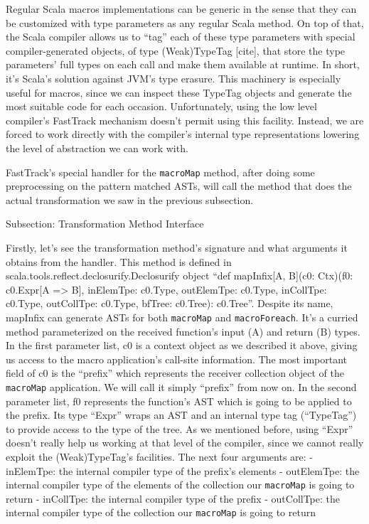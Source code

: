 Regular Scala macros implementations can be generic in the sense that they can
be customized with type parameters as any regular Scala method. On top of that,
the Scala compiler allows us to ``tag'' each of these type parameters with
special compiler-generated objects, of type (Weak)TypeTag [cite], that store the
type parameters' full types on each call and make them available at runtime. In
short, it's Scala's solution against JVM's type erasure. This machinery is
especially useful for macros, since we can inspect these TypeTag objects and
generate the most suitable code for each occasion. Unfortunately, using the low
level compiler's FastTrack mechanism doesn't permit using this facility.
Instead, we are forced to work directly with the compiler's internal type
representations lowering the level of abstraction we can work with.

FastTrack's special handler for the \texttt{macroMap} method, after
doing some preprocessing on the pattern matched ASTs, will call the method
that does the actual transformation we saw in the previous subsection. 


Subsection: Transformation Method Interface

Firstly, let's see the transformation method's signature and what arguments it
obtains from the handler. This method is defined in
scala.tools.reflect.declosurify.Declosurify object ``def mapInfix[A, B](c0:
Ctx)(f0: c0.Expr[A => B], inElemTpe: c0.Type, outElemTpe: c0.Type, inCollTpe:
c0.Type, outCollTpe: c0.Type, bfTree: c0.Tree): c0.Tree''. Despite its name,
mapInfix can generate ASTs for both \texttt{macroMap} and \texttt{macroForeach}. It's a curried
method parameterized on the received function's input (A) and return (B) types.
In the first parameter list, c0 is a context object as we described it above,
giving us access to the macro application's call-site information. The most
important field of c0 is the ``prefix'' which represents the receiver collection
object of the \texttt{macroMap} application. We will call it simply ``prefix''
from now on. In the second parameter
list, f0 represents the function's AST which is going to be applied to the
prefix. Its type ``Expr'' wraps an AST and an internal type tag
(``TypeTag'') to provide access to the type of the tree. As we mentioned
before, using ``Expr'' doesn't really help us working at that level of the
compiler, since we cannot really exploit the (Weak)TypeTag's facilities. The
next four arguments are:
 - inElemTpe: the internal compiler type of the prefix's elements
 - outElemTpe: the internal compiler type of the elements of the collection our
\texttt{macroMap}
is going to return
- inCollTpe: the internal compiler type of the prefix
- outCollTpe: the internal compiler type of the collection our \texttt{macroMap} is going
to return

